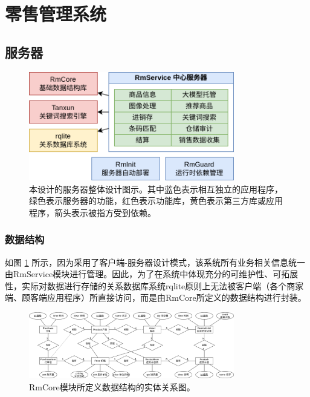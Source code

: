 \newpage
\section{零售管理系统}
\label{sec:foundation}

\subsection{服务器}

\begin{figure}[htbp]
	\centering
	\includegraphics[width=0.8\textwidth]{./imgs/arch-server.png}
	\caption{本设计的服务器整体设计图示。其中蓝色表示相互独立的应用程序，绿色表示服务器的功能，红色表示功能库，黄色表示第三方库或应用程序，箭头表示被指方受到依赖。}
	\label{fig:arch-server}
\end{figure}

\subsubsection{数据结构}
如图 \ref{fig:arch-server} 所示，因为采用了客户端-服务器设计模式，该系统所有业务相关信息统一由RmService模块进行管理。因此，为了在系统中体现充分的可维护性、可拓展性，实际对数据进行存储的关系数据库系统rqlite原则上无法被客户端（各个商家端、顾客端应用程序）所直接访问，而是由RmCore所定义的数据结构进行封装。

\begin{figure}[htbp]
	\centering
	\includegraphics[width=0.8\textwidth]{./imgs/rms-er-rmcore.png}
	\caption{RmCore模块所定义数据结构的实体关系图。}
	\label{fig:rms-er-rmcore}
\end{figure}

